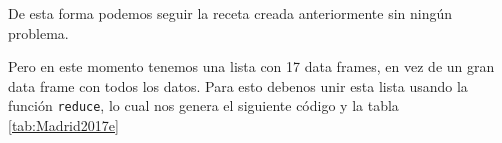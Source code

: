 \documentclass[]{book}
\newenvironment{Shaded}{\begin{snugshade}}{\end{snugshade}}
\newcommand{\DataTypeTok}[1]{\textcolor[rgb]{0.13,0.29,0.53}{#1}}
\newcommand{\DecValTok}[1]{\textcolor[rgb]{0.00,0.00,0.81}{#1}}
\newcommand{\KeywordTok}[1]{\textcolor[rgb]{0.13,0.29,0.53}{\textbf{#1}}}
\newcommand{\NormalTok}[1]{#1}
\newcommand{\OperatorTok}[1]{\textcolor[rgb]{0.81,0.36,0.00}{\textbf{#1}}}
\newcommand{\OtherTok}[1]{\textcolor[rgb]{0.56,0.35,0.01}{#1}}
\newcommand{\StringTok}[1]{\textcolor[rgb]{0.31,0.60,0.02}{#1}}
\begin{document}
De esta forma podemos seguir la receta creada anteriormente sin ningún
problema.

\begin{Shaded}
\end{Shaded}

Pero en este momento tenemos una lista con 17 data frames, en vez de un
gran data frame con todos los datos. Para esto debenos unir esta lista
usando la función \texttt{reduce}, lo cual nos genera el siguiente
código y la tabla \ref{tab:Madrid2017e}
\end{document}
